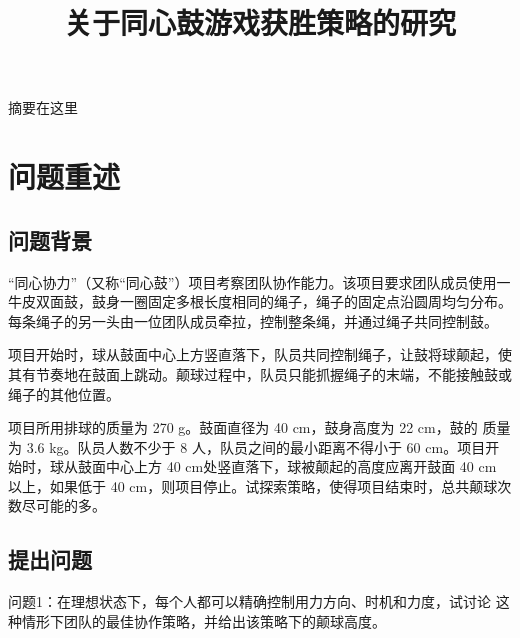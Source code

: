 \documentclass[nocover]{cumcmart}%
\begin{document}
\title{关于同心鼓游戏获胜策略的研究}


\newcommand{\lhp}[1]{\textcolor{cyan}{lhp: #1}}
\newcommand{\znq}[1]{\textcolor{blue}{znq: #1}}



\maketitle
\begin{cnabstract}%

摘要在这里


\end{cnabstract}

\newpage


\section{问题重述}
\subsection{问题背景}
“同心协力”（又称“同心鼓”）项目考察团队协作能力。该项目要求团队成员使用一牛皮双面鼓，鼓身一圈固定多根长度相同的绳子，绳子的固定点沿圆周均匀分布。每条绳子的另一头由一位团队成员牵拉，控制整条绳，并通过绳子共同控制鼓。

项目开始时，球从鼓面中心上方竖直落下，队员共同控制绳子，让鼓将球颠起，使其有节奏地在鼓面上跳动。颠球过程中，队员只能抓握绳子的末端，不能接触鼓或绳子的其他位置。

项目所用排球的质量为 270 g。鼓面直径为 40 cm，鼓身高度为 22 cm，鼓的
质量为 3.6 kg。队员人数不少于 8 人，队员之间的最小距离不得小于 60 cm。项目开始时，球从鼓面中心上方 40 cm处竖直落下，球被颠起的高度应离开鼓面 40 cm 以上，如果低于 40 cm，则项目停止。试探索策略，使得项目结束时，总共颠球次数尽可能的多。

\subsection{提出问题}
问题1：在理想状态下，每个人都可以精确控制用力方向、时机和力度，试讨论
这种情形下团队的最佳协作策略，并给出该策略下的颠球高度。
\end{document}
